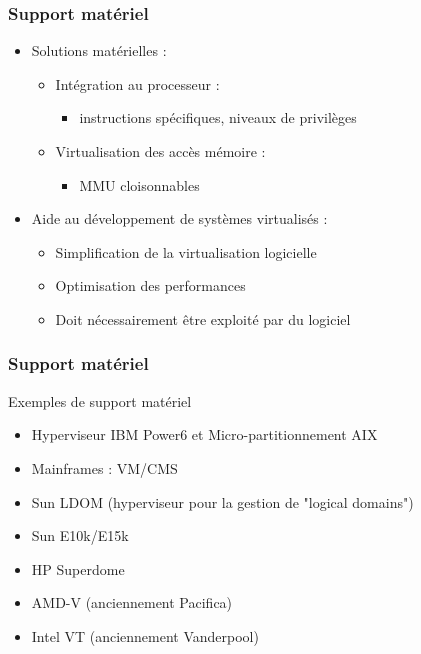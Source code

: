\begin{frame}
\frametitle{Support matériel}
\begin{itemize}
\item <1> Solutions matérielles :
\begin{itemize}
\item Intégration au processeur :
\begin{itemize}
\item instructions spécifiques, niveaux de privilèges

\end{itemize}
\item Virtualisation des accès mémoire :
\begin{itemize}
\item MMU cloisonnables

\end{itemize}
\end{itemize}

\item <2> Aide au développement de systèmes virtualisés :
\begin{itemize}
\item Simplification de la virtualisation logicielle
\item Optimisation des performances
\item Doit nécessairement être exploité par du logiciel
\end{itemize}


\end{itemize}


\end{frame}

\begin{frame}
\frametitle{Support matériel}
\begin{exampleblock}{Exemples de support matériel}
\begin{itemize}
\item Hyperviseur IBM Power6 et Micro-partitionnement AIX
\item Mainframes : VM/CMS
\item Sun LDOM (hyperviseur pour la gestion de "logical domains")
\item Sun E10k/E15k
\item HP Superdome
\item AMD-V (anciennement Pacifica)
\item Intel VT (anciennement Vanderpool)
\end{itemize}
\end{exampleblock}
\end{frame}

